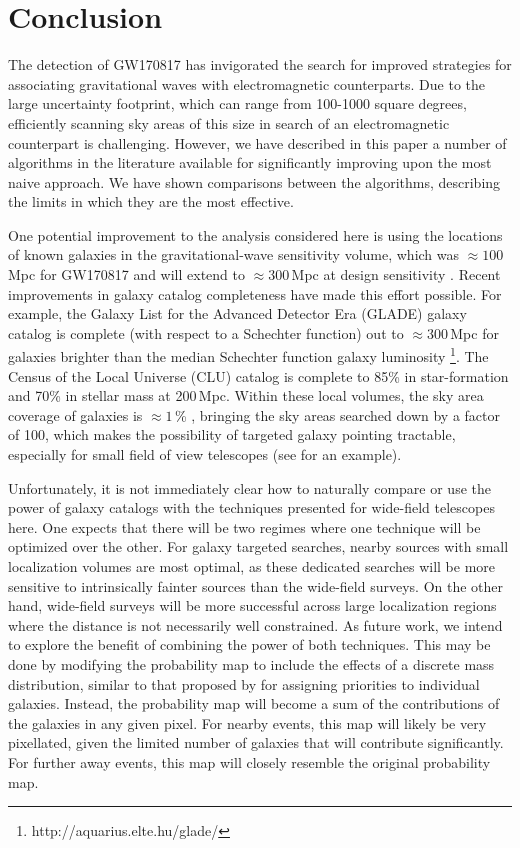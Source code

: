 \documentclass[twocolumn]{aastex62}
\begin{document}
\section{Conclusion}
\label{sec:conclusions}

The detection of GW170817 \citep{AbEA2017b} has invigorated the search for improved strategies for associating gravitational waves with electromagnetic
counterparts.
Due to the large uncertainty footprint, which can range from 100-1000 square degrees, efficiently scanning sky areas  of this size in search of an electromagnetic counterpart is challenging.
However, we have described in this paper a number of algorithms in the literature available for significantly improving upon the most naive approach.
We have shown comparisons between the algorithms, describing the limits in which they are the most effective.

One potential improvement to the analysis considered here is using the locations of known galaxies in the gravitational-wave sensitivity volume, which was $\approx 100$\,Mpc for GW170817 \citep{AbEA2017b} and will extend to $\approx 300$\,Mpc at design sensitivity \citep{aLIGO}. 
Recent improvements in galaxy catalog completeness have made this effort possible. For example, the Galaxy List for the Advanced Detector Era (GLADE) galaxy catalog is complete (with respect to a Schechter function) out to $\approx 300$\,Mpc for galaxies brighter than the median Schechter function galaxy luminosity \footnote{http://aquarius.elte.hu/glade/}. The Census of the Local Universe (CLU) catalog \citep{CoKa2017} is complete to 85\% in star-formation and 70\% in stellar mass at 200\,Mpc.
Within these local volumes, the sky area coverage of galaxies is $\approx 1$\,\% \cite{CoKa2017}, bringing the sky areas searched down by a factor of 100, which makes the possibility of targeted galaxy pointing tractable, especially for small field of view telescopes (see \cite{ArMc2017} for an example). 

Unfortunately, it is not immediately clear how to naturally compare or use the power of galaxy catalogs with the techniques presented for wide-field telescopes here. 
One expects that there will be two regimes where one technique will be optimized over the other.
For galaxy targeted searches, nearby sources with small localization volumes are most optimal, as these dedicated searches will be more sensitive to intrinsically fainter sources than the wide-field surveys.
On the other hand, wide-field surveys will be more successful across large localization regions where the distance is not necessarily well constrained.
As future work, we intend to explore the benefit of combining the power of both techniques. This may be done by modifying the probability map to include the effects of a discrete mass distribution, similar to that proposed by \cite{ArMc2017} for assigning priorities to individual galaxies. Instead, the probability map will become a sum of the contributions of the galaxies in any given pixel. For nearby events, this map will likely be very pixellated, given the limited number of galaxies that will contribute significantly. For further away events, this map will closely resemble the original probability map.
\end{document}
